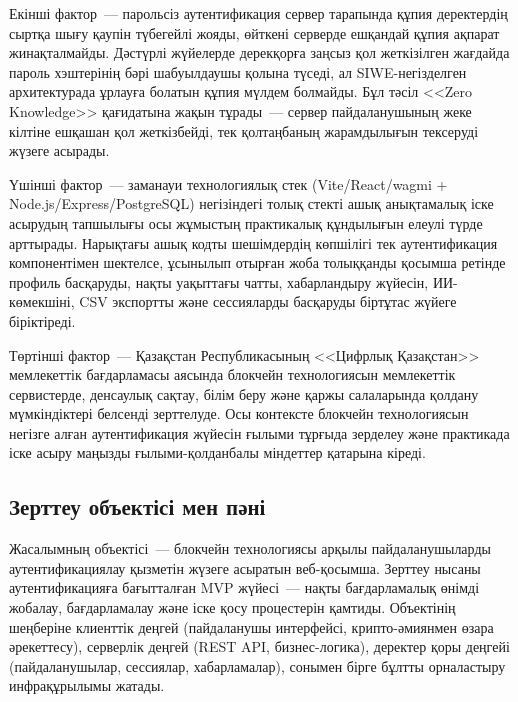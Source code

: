 \documentclass[14pt,a4paper]{extarticle}
\begin{document}
Екінші фактор~--- парольсіз аутентификация сервер тарапында құпия деректердің сыртқа шығу қаупін түбегейлі жояды, өйткені серверде ешқандай құпия ақпарат жинақталмайды. Дәстүрлі жүйелерде дерекқорға заңсыз қол жеткізілген жағдайда пароль хэштерінің бәрі шабуылдаушы қолына түседі, ал SIWE-негізделген архитектурада ұрлауға болатын құпия мүлдем болмайды. Бұл тәсіл <<Zero Knowledge>> қағидатына жақын тұрады~--- сервер пайдаланушының жеке кілтіне ешқашан қол жеткізбейді, тек қолтаңбаның жарамдылығын тексеруді жүзеге асырады.

Үшінші фактор~--- заманауи технологиялық стек (Vite/React/wagmi + Node.js/Express/PostgreSQL) негізіндегі толық стекті ашық анықтамалық іске асырудың тапшылығы осы жұмыстың практикалық құндылығын елеулі түрде арттырады. Нарықтағы ашық кодты шешімдердің көпшілігі тек аутентификация компонентімен шектелсе, ұсынылып отырған жоба толыққанды қосымша ретінде профиль басқаруды, нақты уақыттағы чатты, хабарландыру жүйесін, ИИ-көмекшіні, CSV экспортты және сессияларды басқаруды біртұтас жүйеге біріктіреді.

Төртінші фактор~--- Қазақстан Республикасының <<Цифрлық Қазақстан>> мемлекеттік бағдарламасы аясында блокчейн технологиясын мемлекеттік сервистерде, денсаулық сақтау, білім беру және қаржы салаларында қолдану мүмкіндіктері белсенді зерттелуде. Осы контексте блокчейн технологиясын негізге алған аутентификация жүйесін ғылыми тұрғыда зерделеу және практикада іске асыру маңызды ғылыми-қолданбалы міндеттер қатарына кіреді.

\subsection{Зерттеу объектісі мен пәні}

Жасалымның объектісі~--- блокчейн технологиясы арқылы пайдаланушыларды аутентификациялау қызметін жүзеге асыратын веб-қосымша. Зерттеу нысаны аутентификацияға бағытталған MVP жүйесі~--- нақты бағдарламалық өнімді жобалау, бағдарламалау және іске қосу процестерін қамтиды. Объектінің шеңберіне клиенттік деңгей (пайдаланушы интерфейсі, крипто-әмиянмен өзара әрекеттесу), серверлік деңгей (REST API, бизнес-логика), деректер қоры деңгейі (пайдаланушылар, сессиялар, хабарламалар), сонымен бірге бұлтты орналастыру инфрақұрылымы жатады.
\end{document}
